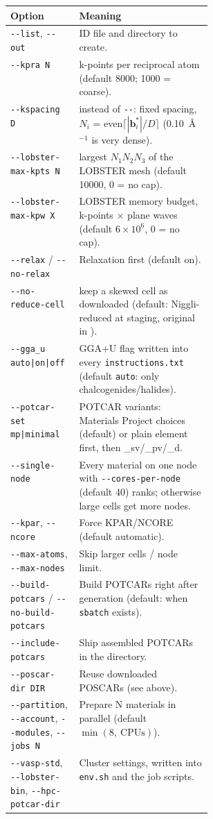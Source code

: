 \documentclass[11pt,a4paper]{scrartcl}
\newcommand{\thead}{\rowcolor{lightblue}}
\newcommand{\cmd}[1]{\texttt{\detokenize{#1}}}
\newcommand{\opt}[1]{\texttt{-{}-\detokenize{#1}}}
\begin{document}
\begin{tabularx}{\linewidth}{@{}>{\raggedright\arraybackslash}p{0.34\linewidth}X@{}}
\thead
Option & Meaning \\ \midrule
\texttt{-{}-list}, \texttt{-{}-out} & ID file and directory to create. \\
\texttt{-{}-kpra N} & k-points per reciprocal atom (default 8000; 1000 = coarse). \\
\texttt{-{}-kspacing D} & instead of \opt{kpra}: fixed spacing, $N_i$ = even$\lceil|\mathbf b_i^*|/D\rceil$ (0.10~\AA$^{-1}$ is very dense). \\
\texttt{-{}-lobster-max-kpts N} & largest $N_1N_2N_3$ of the LOBSTER mesh (default 10000, 0 = no cap). \\
\texttt{-{}-lobster-max-kpw X} & LOBSTER memory budget, k-points $\times$ plane waves (default $6\times10^6$, 0 = no cap). \\
\texttt{-{}-relax} / \texttt{-{}-no-relax} & Relaxation first (default on). \\
\texttt{-{}-no-reduce-cell} & keep a skewed cell as downloaded (default: Niggli-reduced at staging, original in \cmd{POSCAR.input}). \\
\texttt{-{}-gga\_u auto|on|off} & GGA+U flag written into every
  \texttt{instructions.txt} (default \texttt{auto}: only chalcogenides/halides). \\
\texttt{-{}-potcar-set mp|minimal} & POTCAR variants: Materials Project choices
  (default) or plain element first, then \_sv/\_pv/\_d. \\
\texttt{-{}-single-node} & Every material on one node with
  \texttt{-{}-cores-per-node} (default 40) ranks; otherwise large cells get
  more nodes. \\
\texttt{-{}-kpar}, \texttt{-{}-ncore} & Force KPAR/NCORE (default automatic). \\
\texttt{-{}-max-atoms}, \texttt{-{}-max-nodes} & Skip larger cells / node limit. \\
\texttt{-{}-build-potcars} / \texttt{-{}-no-build-potcars} & Build POTCARs
  right after generation (default: when \texttt{sbatch} exists). \\
\texttt{-{}-include-potcars} & Ship assembled POTCARs in the directory. \\
\texttt{-{}-poscar-dir DIR} & Reuse downloaded POSCARs (see above). \\
\texttt{-{}-partition}, \texttt{-{}-account}, \texttt{-{}-modules},
\texttt{-{}-jobs N} & Prepare N materials in parallel (default
  $\min(8,\ \mathrm{CPUs})$). \\
  \texttt{-{}-vasp-std}, \texttt{-{}-lobster-bin},
  \texttt{-{}-hpc-potcar-dir} & Cluster settings, written into \texttt{env.sh}
  and the job scripts. \\
\bottomrule
\end{tabularx}
\end{document}
